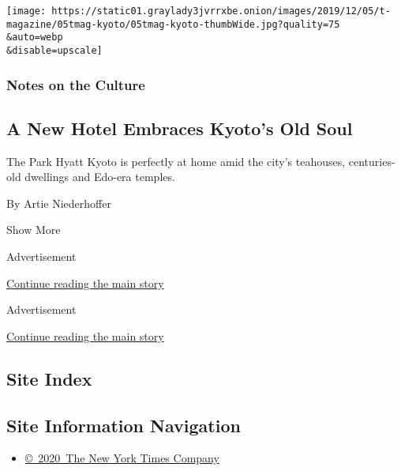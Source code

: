 \begin{enumerate}
  \texttt{[image: https://static01.graylady3jvrrxbe.onion/images/2019/12/05/t-magazine/05tmag-kyoto/05tmag-kyoto-thumbWide.jpg?quality=75\\\&auto=webp\\\&disable=upscale]}

  \hypertarget{notes-on-the-culture-1}{%
  \subsubsection{Notes on the Culture}\label{notes-on-the-culture-1}}

  \hypertarget{a-new-hotel-embraces-kyotos-old-soul}{%
  \subsection{A New Hotel Embraces Kyoto's Old
  Soul}\label{a-new-hotel-embraces-kyotos-old-soul}}

  The Park Hyatt Kyoto is perfectly at home amid the city's teahouses,
  centuries-old dwellings and Edo-era temples.

  By Artie Niederhoffer
\end{enumerate}

Show More

Advertisement

\protect\hyperlink{after-mid2}{Continue reading the main story}

Advertisement

\protect\hyperlink{after-mktg}{Continue reading the main story}

\hypertarget{site-index}{%
\subsection{Site Index}\label{site-index}}

\hypertarget{site-information-navigation}{%
\subsection{Site Information
Navigation}\label{site-information-navigation}}

\begin{itemize}
\tightlist
\item
  \href{https://help.nytimes3xbfgragh.onion/hc/en-us/articles/115014792127-Copyright-notice}{©~2020~The
  New York Times Company}
\end{itemize}

